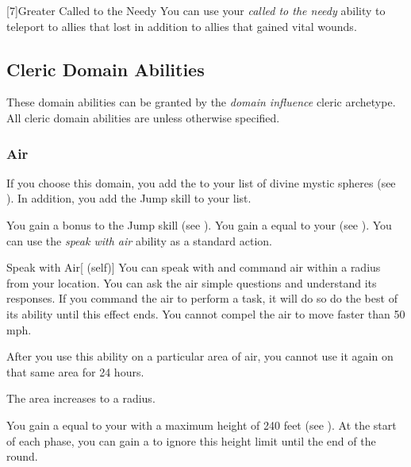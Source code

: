        [7]{Greater Called to the Needy} You can use your \textit{called to the needy} ability to teleport to allies that lost  in addition to allies that gained vital wounds.

    \newpage
    \subsection{Cleric Domain Abilities}\label{Cleric Domain Abilities}
        These domain abilities can be granted by the \textit{domain influence} cleric archetype.
        All cleric domain abilities are  unless otherwise specified.

        \subsubsection{Air}
            If you choose this domain, you add the   to your list of divine mystic spheres (see ).
            In addition, you add the Jump skill to your  list.

             You gain a  bonus to the Jump skill (see ).
             You gain a  equal to your  (see ).
             You can use the \textit{speak with air} ability as a standard action.
            \begin{attuneability}{Speak with Air}[ (self)]
                You can speak with and command air within a \areahuge radius  from your location.
                You can ask the air simple questions and understand its responses.
                If you command the air to perform a task, it will do so do the best of its ability until this effect ends.
                You cannot compel the air to move faster than 50 mph.

                After you use this ability on a particular area of air, you cannot use it again on that same area for 24 hours.

                \rankline
                 The area increases to a \areagarg radius.
            \end{attuneability}
             You gain a  equal to your  with a maximum height of 240 feet (see ).
            At the start of each phase, you can gain a  to ignore this height limit until the end of the round.

